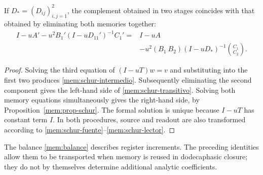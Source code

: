 \begin{proposition}
If \(D_*=(D_{ij})_{i,j=1}^2\), the complement obtained in two stages
coincides with that obtained by eliminating both memories together:
\begin{equation}
 \begin{split}
 I-uA'-u^2B_1'(I-uD_{11}')^{-1}C_1'
 ={}&I-uA\\
 &-u^2(B_1\ B_2)(I-uD_*)^{-1}\binom{C_1}{C_2}.
 \end{split}
 \label{mem:schur-transitivo}
\end{equation}
\end{proposition}
\begin{proof}
Solving the third equation of \((I-uT)w=v\) and substituting into the
first two produces \eqref{mem:schur-intermedio}. Subsequently eliminating the
second component gives the left-hand side of
\eqref{mem:schur-transitivo}. Solving both memory equations
simultaneously gives the right-hand side, by Proposition~\ref{mem:prop-schur}.
The formal solution is unique because \(I-uT\) has constant term
\(I\). In both procedures, source and readout
are also transformed according to \eqref{mem:schur-fuente}--\eqref{mem:schur-lector}.
\end{proof}

The balance \eqref{mem:balance} describes register increments.
The preceding identities allow them to be transported when memory is reused
in dodecaphasic closure; they do not by themselves determine additional analytic
coefficients.
